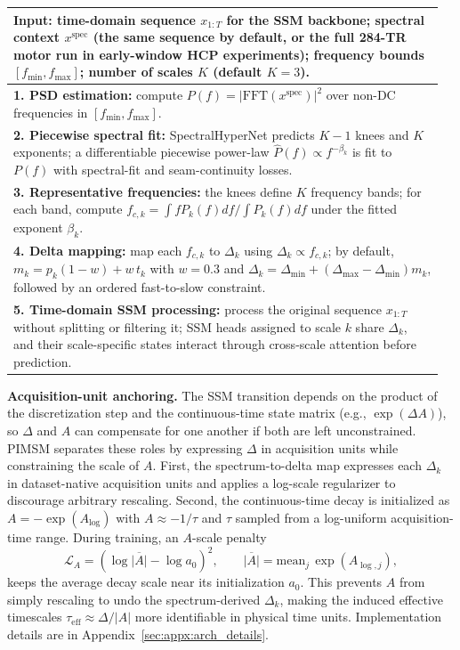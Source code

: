 \documentclass{article}
\begin{document}
\begin{algorithm}[t]
\centering
\footnotesize
\caption{Spectrum-to-$\Delta$ parameterization in PIMSM.}
\label{alg:spectrum_to_delta}
\begin{tabular}{p{0.96\linewidth}}
\toprule
\textbf{Input:} time-domain sequence $x_{1:T}$ for the SSM backbone; spectral context $x^{\mathrm{spec}}$ (the same sequence by default, or the full 284-TR motor run in early-window HCP experiments); frequency bounds $[f_{\min}, f_{\max}]$; number of scales $K$ (default $K=3$). \\
\midrule
\textbf{1. PSD estimation:} compute $P(f)=|\mathrm{FFT}(x^{\mathrm{spec}})|^2$ over non-DC frequencies in $[f_{\min}, f_{\max}]$. \\
\textbf{2. Piecewise spectral fit:} SpectralHyperNet predicts $K-1$ knees and $K$ exponents; a differentiable piecewise power-law $\hat P(f)\propto f^{-\beta_k}$ is fit to $P(f)$ with spectral-fit and seam-continuity losses. \\
\textbf{3. Representative frequencies:} the knees define $K$ frequency bands; for each band, compute $f_{c,k}=\int fP_k(f)df/\int P_k(f)df$ under the fitted exponent $\beta_k$. \\
\textbf{4. Delta mapping:} map each $f_{c,k}$ to $\Delta_k$ using $\Delta_k \propto f_{c,k}$; by default, $m_k=p_k(1-w)+w\,t_k$ with $w=0.3$ and $\Delta_k=\Delta_{\min}+(\Delta_{\max}-\Delta_{\min})m_k$, followed by an ordered fast-to-slow constraint. \\
\textbf{5. Time-domain SSM processing:} process the original sequence $x_{1:T}$ without splitting or filtering it; SSM heads assigned to scale $k$ share $\Delta_k$, and their scale-specific states interact through cross-scale attention before prediction. \\
\bottomrule
\end{tabular}
\end{algorithm}

\textbf{Acquisition-unit anchoring.} The SSM transition depends on the product of the discretization step and the continuous-time state matrix (e.g., $\exp(\Delta A)$), so $\Delta$ and $A$ can compensate for one another if both are left unconstrained. PIMSM separates these roles by expressing $\Delta$ in acquisition units while constraining the scale of $A$. First, the spectrum-to-delta map expresses each $\Delta_k$ in dataset-native acquisition units and applies a log-scale regularizer to discourage arbitrary rescaling. Second, the continuous-time decay is initialized as $A=-\exp(A_{\log})$ with $A\approx -1/\tau$ and $\tau$ sampled from a log-uniform acquisition-time range. During training, an $A$-scale penalty
\[
\mathcal{L}_{A}
= \left(\log \overline{|A|} - \log a_0\right)^2,
\qquad
\overline{|A|}=\mathrm{mean}_j\,\exp(A_{\log,j}),
\]
keeps the average decay scale near its initialization $a_0$. This prevents $A$ from simply rescaling to undo the spectrum-derived $\Delta_k$, making the induced effective timescales $\tau_{\mathrm{eff}}\approx \Delta/|A|$ more identifiable in physical time units. Implementation details are in Appendix~\ref{sec:appx:arch_details}.
\end{document}
